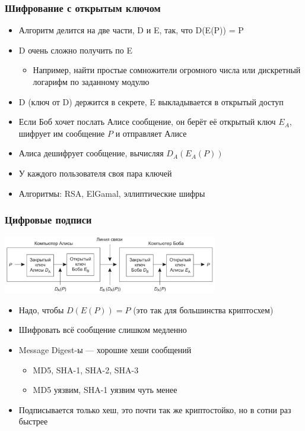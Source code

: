 \documentclass{../../slides-style}
\begin{document}
    \begin{frame}
        \frametitle{Шифрование с открытым ключом}
        \begin{itemize}
            \item Алгоритм делится на две части, D и E, так, что D(E(P)) = P
            \item D очень сложно получить по E
            \begin{itemize}
                \item Например, найти простые сомножители огромного числа или дискретный логарифм по заданному модулю
            \end{itemize}
            \item D (ключ от D) держится в секрете, E выкладывается в открытый доступ
            \item Если Боб хочет послать Алисе сообщение, он берёт её открытый ключ $E_A$, шифрует им сообщение $P$ и отправляет Алисе
            \item Алиса дешифрует сообщение, вычисляя $D_A(E_A(P))$
            \item У каждого пользователя своя пара ключей
            \item Алгоритмы: RSA, ElGamal, эллиптические шифры
        \end{itemize}
    \end{frame}

    \begin{frame}
        \frametitle{Цифровые подписи}
        \begin{center}
            \includegraphics[width=0.7\textwidth]{signature.png}
        \end{center}
        \begin{itemize}
            \item Надо, чтобы $D(E(P)) = P$ (это так для большинства криптосхем)
            \item Шифровать всё сообщение слишком медленно
            \item Message Digest-ы --- хорошие хеши сообщений
            \begin{itemize}
                \item MD5, SHA-1, SHA-2, SHA-3
                \item MD5 уязвим, SHA-1 уязвим чуть менее
            \end{itemize}
            \item Подписывается только хеш, это почти так же криптостойко, но в сотни раз быстрее
        \end{itemize}
    \end{frame}
\end{document}
